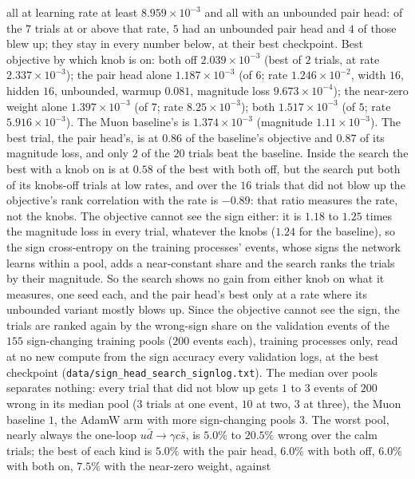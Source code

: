 \documentclass[11pt]{article}
\newcommand{\code}[1]{\texttt{#1}}
\begin{document}
\begin{itemize}
    all at learning rate at least $8.959\times10^{-3}$ and all with an unbounded pair head: of the $7$ trials at or
    above that rate, $5$ had an unbounded pair head and $4$ of those blew up; they stay in every number below, at
    their best checkpoint. Best objective by which knob is on: both off $2.039\times10^{-3}$ (best of $2$ trials, at
    rate $2.337\times10^{-3}$); the pair head alone $1.187\times10^{-3}$ (of $6$; rate $1.246\times10^{-2}$, width
    $16$, hidden $16$, unbounded, warmup $0.081$, magnitude loss $9.673\times10^{-4}$); the near-zero weight alone
    $1.397\times10^{-3}$ (of $7$; rate $8.25\times10^{-3}$); both $1.517\times10^{-3}$ (of $5$; rate
    $5.916\times10^{-3}$). The Muon baseline's is $1.374\times10^{-3}$ (magnitude $1.11\times10^{-3}$). The best trial,
    the pair head's, is at $0.86$ of the baseline's objective and $0.87$ of its magnitude loss, and only $2$ of the
    $20$ trials beat the baseline. Inside the search the best with a knob on is at $0.58$ of the best with both off,
    but the search put both of its knobs-off trials at low rates, and over the $16$ trials that did not blow up the
    objective's rank correlation with the rate is $-0.89$: that ratio measures the rate, not the knobs. The objective
    cannot see the sign either: it is $1.18$ to $1.25$ times the magnitude loss in every trial, whatever the knobs
    ($1.24$ for the baseline), so the sign cross-entropy on the training processes' events, whose signs the network
    learns within a pool, adds a near-constant share and the search ranks the trials by their magnitude. So the
    search shows no gain from either knob on what it measures, one seed each, and the pair head's best only at a rate
    where its unbounded variant mostly blows up.
    Since the objective cannot see the sign, the trials are ranked again by the wrong-sign share on the validation
    events of the $155$ sign-changing training pools ($200$ events each), training processes only, read at no new
    compute from the sign accuracy every validation logs, at the best checkpoint
    (\code{data/sign\_head\_search\_signlog.txt}). The median over pools separates nothing: every trial that did not
    blow up gets $1$ to $3$ events of $200$ wrong in its median pool ($3$ trials at one event, $10$ at two, $3$ at
    three), the Muon baseline $1$, the AdamW arm with more sign-changing pools $3$. The worst pool, nearly always the
    one-loop $u\bar d\to\gamma c\bar s$, is $5.0\%$ to $20.5\%$ wrong over the calm trials; the best of each kind is
    $5.0\%$ with the pair head, $6.0\%$ with both off, $6.0\%$ with both on, $7.5\%$ with the near-zero weight, against

\end{itemize}
\end{document}

